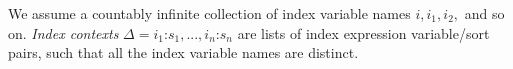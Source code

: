 

We assume a countably infinite collection of index variable names $i,
i_1, i_2,$ and so on. \emph{Index contexts} $\Delta = i_1 \mathord:
s_1, ..., i_n \mathord: s_n$ are lists of index expression
variable/sort pairs, such that all the index variable names are
distinct.


